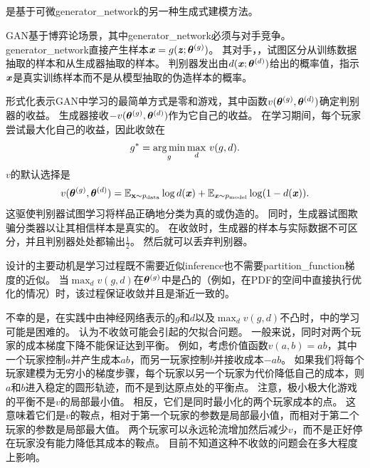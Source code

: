 \subsection{}
\label{sec:generative_adversarial_networks}

\citep{Goodfellow-et-al-NIPS2014-small}是基于可微\gls{generator_network}的另一种生成式建模方法。


\gls{GAN}基于博弈论场景，其中\gls{generator_network}必须与对手竞争。
\gls{generator_network}直接产生样本$\boldsymbol{\mathit{x}} = g(\boldsymbol{\mathit{z}}; \boldsymbol{\theta}^{(g)})$。
其对手，，试图区分从训练数据抽取的样本和从生成器抽取的样本。
判别器发出由$d(\boldsymbol{\mathit{x}}; \boldsymbol{\theta}^{(d)})$给出的概率值，指示$\boldsymbol{\mathit{x}}$是真实训练样本而不是从模型抽取的伪造样本的概率。



形式化表示\gls{GAN}中学习的最简单方式是零和游戏，其中函数$v(\boldsymbol{\theta}^{(g)}, \boldsymbol{\theta}^{(d)})$确定判别器的收益。
生成器接收$-v(\boldsymbol{\theta}^{(g)}, \boldsymbol{\theta}^{(d)})$作为它自己的收益。
在学习期间，每个玩家尝试最大化自己的收益，因此收敛在
\begin{align}
 g^* = \underset{g}{\arg\min} \, \underset{d}{\max}~ v(g, d).
\end{align}
$v$的默认选择是
\begin{align}
 v(\boldsymbol{\theta}^{(g)}, \boldsymbol{\theta}^{(d)}) = \mathbb{E}_{\mathbf{x} \sim p_{\text{data}}} 
 \log d(\boldsymbol{\mathit{x}}) + \mathbb{E}_{\boldsymbol{\mathit{x}} \sim p_{\text{model}}} \log (1 - d(\boldsymbol{\mathit{x}})).
\end{align}
这驱使判别器试图学习将样品正确地分类为真的或伪造的。
同时，生成器试图欺骗分类器以让其相信样本是真实的。
在收敛时，生成器的样本与实际数据不可区分，并且判别器处处都输出$\frac{1}{2}$。
然后就可以丢弃判别器。


设计的主要动机是学习过程既不需要近似\gls{inference}也不需要\gls{partition_function}梯度的近似。
当$\max_d v(g,d)$在$\boldsymbol{\theta}^{(g)}$中是凸的（例如，在\gls{PDF}的空间中直接执行优化的情况）时，该过程保证收敛并且是渐近一致的。


不幸的是，在实践中由神经网络表示的$g$和$d$以及$\max_d v(g, d)$不凸时，中的学习可能是困难的。
\citet{Goodfellow-ICLR2015} 认为不收敛可能会引起的欠拟合问题。
一般来说，同时对两个玩家的成本梯度下降不能保证达到平衡。
例如，考虑价值函数$v(a,b) = ab$，其中一个玩家控制$a$并产生成本$ab$，而另一玩家控制$b$并接收成本$-ab$。
如果我们将每个玩家建模为无穷小的梯度步骤，每个玩家以另一个玩家为代价降低自己的成本，则$a$和$b$进入稳定的圆形轨迹，而不是到达原点处的平衡点。
注意，极小极大化游戏的平衡不是$v$的局部最小值。
相反，它们是同时最小化的两个玩家成本的点。
这意味着它们是$v$的鞍点，相对于第一个玩家的参数是局部最小值，而相对于第二个玩家的参数是局部最大值。
两个玩家可以永远轮流增加然后减少$v$，而不是正好停在玩家没有能力降低其成本的鞍点。
目前不知道这种不收敛的问题会在多大程度上影响。
 
